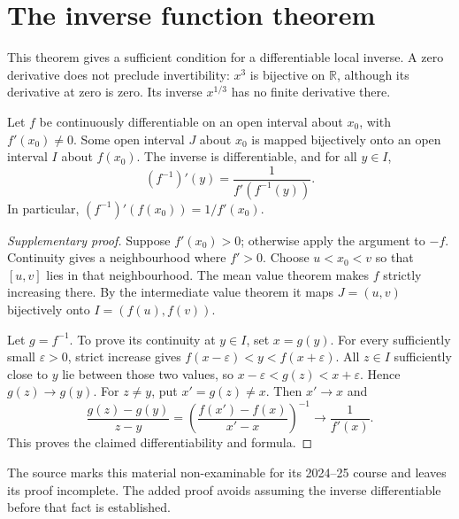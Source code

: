 \section{The inverse function theorem}
This theorem gives a sufficient condition for a differentiable local
inverse. A zero derivative does not preclude invertibility: $x^3$ is
bijective on $\mathbb R$, although its derivative at zero is zero.
Its inverse $x^{1/3}$ has no finite derivative there.

\begin{theorem}
Let $f$ be continuously differentiable on an open interval about $x_0$,
with $f'(x_0)\ne0$. Some open interval $J$ about $x_0$ is mapped bijectively
onto an open interval $I$ about $f(x_0)$. The inverse is differentiable,
and for all $y\in I$,
\[
(f^{-1})'(y)=\frac1{f'(f^{-1}(y))}.
\]
In particular, $(f^{-1})'(f(x_0))=1/f'(x_0)$.
\end{theorem}
\begin{proof}[Supplementary proof]
Suppose $f'(x_0)>0$; otherwise apply the argument to $-f$.
Continuity gives a neighbourhood where $f'>0$. Choose $u<x_0<v$ so that
$[u,v]$ lies in that neighbourhood. The mean value theorem makes $f$
strictly increasing there. By the intermediate value theorem it maps
$J=(u,v)$ bijectively onto $I=(f(u),f(v))$.

Let $g=f^{-1}$. To prove its continuity at $y\in I$, set $x=g(y)$.
For every sufficiently small $\varepsilon>0$, strict increase gives
$f(x-\varepsilon)<y<f(x+\varepsilon)$. All $z\in I$ sufficiently close
to $y$ lie between those two values, so
$x-\varepsilon<g(z)<x+\varepsilon$. Hence $g(z)\to g(y)$.
For $z\ne y$, put $x'=g(z)\ne x$. Then $x'\to x$ and
\[
\frac{g(z)-g(y)}{z-y}
=\left(\frac{f(x')-f(x)}{x'-x}\right)^{-1}
\longrightarrow\frac1{f'(x)}.
\]
This proves the claimed differentiability and formula.
\end{proof}
The source marks this material non-examinable for its 2024--25 course
and leaves its proof incomplete. The added proof avoids assuming the
inverse differentiable before that fact is established.
